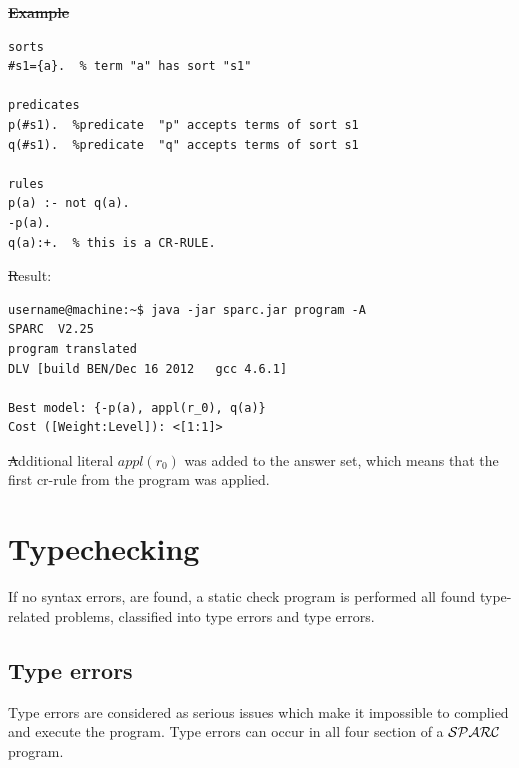 \documentclass[12pt, letterpaper]{article}
\begin{document}
\st \textbf{Example}
\begin{verbatim}
sorts
#s1={a}.  % term "a" has sort "s1"

predicates
p(#s1).  %predicate  "p" accepts terms of sort s1 
q(#s1).  %predicate  "q" accepts terms of sort s1 

rules
p(a) :- not q(a).
-p(a).
q(a):+.  % this is a CR-RULE. 
\end{verbatim}
\st Result:
\begin{verbatim}
username@machine:~$ java -jar sparc.jar program -A
SPARC  V2.25
program translated
DLV [build BEN/Dec 16 2012   gcc 4.6.1]

Best model: {-p(a), appl(r_0), q(a)}
Cost ([Weight:Level]): <[1:1]>
\end{verbatim}

\st Additional literal $appl(r_0)$ was added to the answer set, which means that the 
first cr-rule from the program was applied.

\section{Typechecking}
If no syntax errors, are found,  a static check program is performed all found type-related problems, classified into type errors and type errors.
\subsection{Type errors}
Type errors are considered as serious issues which make it  impossible to complied and execute the program.
Type errors can occur in all four section of a ${\cal SPARC}$ program.
\end{document}
